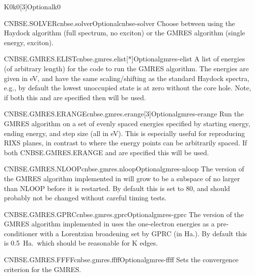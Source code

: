 \documentclass[11pt]{report}
\begin{document}
\begin{Card}{K0}{k0[3]}{Optional}{k0}
\begin{Card}{CNBSE.SOLVER}{cnbse.solver}{Optional}{cnbse-solver}
Choose between using the Haydock algorithm (full spectrum, no exciton) or the GMRES algorithm (single energy, exciton).
\end{Card}

\begin{Card}{CNBSE.GMRES.ELIST}{cnbse.gmres.elist[*]}{Optional}{gmres-elist}
A list of energies (of arbitrary length) for the code to run the GMRES algorithm. 
The energies are given in eV, and have the same scaling/shifting as the standard Haydock spectra, e.g., by default the lowest unoccupied state is at zero without the core hole.
Note, if both this and  are specified then  will be used.
\end{Card}

\begin{Card}{CNBSE.GMRES.ERANGE}{cnbse.gmres.erange[3]}{Optional}{gmres-erange}
Run the GMRES algorithm on a set of evenly spaced energies specified by starting energy, ending energy, and step size (all in eV). 
This is especially useful for reproducing RIXS planes, in contrast to   where the energy points can be arbitrarily spaced.
If both CNBSE.GMRES.ERANGE and  are specified this will be used.
\end{Card}

\begin{Card}{CNBSE.GMRES.NLOOP}{cnbse.gmres.nloop}{Optional}{gmres-nloop}
The version of the GMRES algorithm implemented in  will grow to be a subspace of no larger than NLOOP before it is restarted. By default this is set to 80, and should probably not be changed without careful timing tests.
\end{Card}

\begin{Card}{CNBSE.GMRES.GPRC}{cnbse.gmres.gprc}{Optional}{gmres-gprc}
The version of the GMRES algorithm implemented in  uses the one-electron energies as a pre-conditioner with a Lorentzian broadening set by GPRC (in Ha.). By default this is 0.5~Ha.\ which should be reasonable for K edges.
 \end{Card}

\begin{Card}{CNBSE.GMRES.FFFF}{cnbse.gmres.ffff}{Optional}{gmres-ffff}
Sets the convergence criterion for the GMRES.
\end{Card}



\end{Card}
\end{document}
